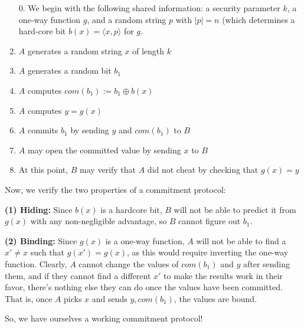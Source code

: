 \documentclass[11pt]{article}
\begin{document}
\begin{enumerate}
\item[0.] We begin with the following shared information: a security parameter \(k\), a one-way function \(g\), and a random string \(p\) with \(|p|=n\) (which determines a hard-core bit \(b(x)=\langle x,p\rangle\) for \(g\).
\item \(A\) generates a random string \(x\) of length \(k\)
\item \(A\) generates a random bit \(b_1\)
\item \(A\) computes \(com(b_1):=b_1\oplus b(x)\)
\item \(A\) computes \(y=g(x)\)
\item \(A\) commits \(b_1\) by sending \(y\) and \(com(b_1)\) to \(B\)
\item \(A\) may open the committed value by sending \(x\) to \(B\)
\item At this point, \(B\) may verify that \(A\) did not cheat by checking that \(g(x)=y\)
\end{enumerate}

Now, we verify the two properties of a commitment protocol:\medskip

\textbf{(1) Hiding:} Since \(b(x)\) is a hardcore bit, \(B\) will not be able to predict it from \(g(x)\) with any non-negligible advantage, so \(B\) cannot figure out \(b_1\).

\textbf{(2) Binding:} Since \(g(x)\) is a one-way function, \(A\) will not be able to find a \(x'\ne x\) such that \(g(x') = g(x)\), as this would require inverting the one-way function. Clearly, \(A\) cannot change the values of \(com(b_1)\) and \(y\) after sending them, and if they cannot find a different \(x'\) to make the results work in their favor, there's nothing else they can do once the values have been committed. That is, once \(A\) picks \(x\) and sends \(y, com(b_1)\), the values are bound.\bigskip

So, we have ourselves a working commitment protocol!
\end{document}
